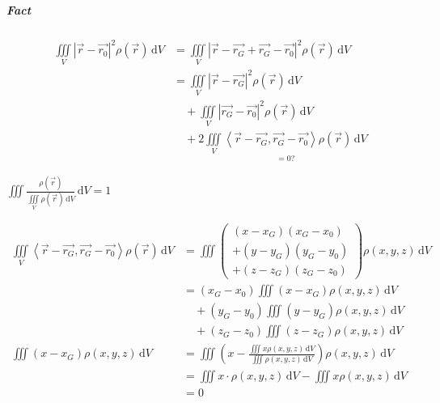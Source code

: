 \subparagraph*{Fact}

\begin{align*}
    \iiint\limits_V\left|\overrightarrow{r}-\overrightarrow{r_0}\right|^2\rho\left(\overrightarrow{r}\right)\,\mathrm{d}V
     & =\iiint\limits_V\left|\overrightarrow{r}-\overrightarrow{r_G}+\overrightarrow{r_G}-\overrightarrow{r_0}\right|^2\rho\left(\overrightarrow{r}\right)\,\mathrm{d}V                             \\
     & =\iiint\limits_V\left|\overrightarrow{r}-\overrightarrow{r_G}\right|^2\rho\left(\overrightarrow{r}\right)\,\mathrm{d}V                                                                       \\
     & \quad+\iiint\limits_V\left|\overrightarrow{r_G}-\overrightarrow{r_0}\right|^2\rho\left(\overrightarrow{r}\right)\,\mathrm{d}V                                                                \\
     & \quad+2\underset{=0?}{\boxed{\iiint\limits_V\left<\overrightarrow{r}-\overrightarrow{r_G},\overrightarrow{r_G}-\overrightarrow{r_0}\right>\rho\left(\overrightarrow{r}\right)\,\mathrm{d}V}}
\end{align*}

$\iiint\frac{\rho\left(\overrightarrow{r}\right)}{\iiint\limits_V\rho\left(\overrightarrow{r}\right)\,\mathrm{d}V}\,\mathrm{d}V=1$

\begin{align*}
    \iiint\limits_V\left<\overrightarrow{r}-\overrightarrow{r_G},\overrightarrow{r_G}-\overrightarrow{r_0}\right>\rho\left(\overrightarrow{r}\right)\,\mathrm{d}V
     & =\iiint\left(\substack{(x-x_G)(x_G-x_0)                                                                                \\+(y-y_G)(y_G-y_0)\\+(z-z_G)(z_G-z_0)}\right)\rho(x,y,z)\,\mathrm{d}V                         \\
     & =(x_G-x_0)\iiint(x-x_G)\rho(x,y,z)\,\mathrm{d}V                                                                        \\
     & \quad+(y_G-y_0)\iiint(y-y_G)\rho(x,y,z)\,\mathrm{d}V                                                                   \\
     & \quad+(z_G-z_0)\iiint(z-z_G)\rho(x,y,z)\,\mathrm{d}V                                                                   \\
    \iiint(x-x_G)\rho(x,y,z)\,\mathrm{d}V
     & =\iiint\left(x-\frac{\iiint x\rho(x,y,z)\,\mathrm{d}V}{\iiint \rho(x,y,z)\,\mathrm{d}V}\right)\rho(x,y,z)\,\mathrm{d}V \\
     & =\iiint x\cdot\rho(x,y,z)\,\mathrm{d}V-\iiint x\rho(x,y,z)\,\mathrm{d}V                                                \\
     & =0
\end{align*}

